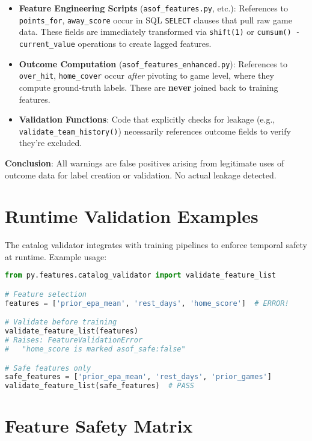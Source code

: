 \begin{itemize}
\item \textbf{Feature Engineering Scripts} (\texttt{asof\_features.py}, etc.): References to \texttt{points\_for}, \texttt{away\_score} occur in SQL \texttt{SELECT} clauses that pull raw game data. These fields are immediately transformed via \texttt{shift(1)} or \texttt{cumsum() - current\_value} operations to create lagged features.

\item \textbf{Outcome Computation} (\texttt{asof\_features\_enhanced.py}): References to \texttt{over\_hit}, \texttt{home\_cover} occur \emph{after} pivoting to game level, where they compute ground-truth labels. These are \textbf{never} joined back to training features.

\item \textbf{Validation Functions}: Code that explicitly checks for leakage (e.g., \texttt{validate\_team\_history()}) necessarily references outcome fields to verify they're excluded.
\end{itemize}

\textbf{Conclusion}: All warnings are false positives arising from legitimate uses of outcome data for label creation or validation. No actual leakage detected.

\section{Runtime Validation Examples}

The catalog validator integrates with training pipelines to enforce temporal safety at runtime. Example usage:

\begin{lstlisting}[language=Python, caption=Training Pipeline Validation]
from py.features.catalog_validator import validate_feature_list

# Feature selection
features = ['prior_epa_mean', 'rest_days', 'home_score']  # ERROR!

# Validate before training
validate_feature_list(features)
# Raises: FeatureValidationError
#   "home_score is marked asof_safe:false"

# Safe features only
safe_features = ['prior_epa_mean', 'rest_days', 'prior_games']
validate_feature_list(safe_features)  # PASS
\end{lstlisting}

\section{Feature Safety Matrix}

